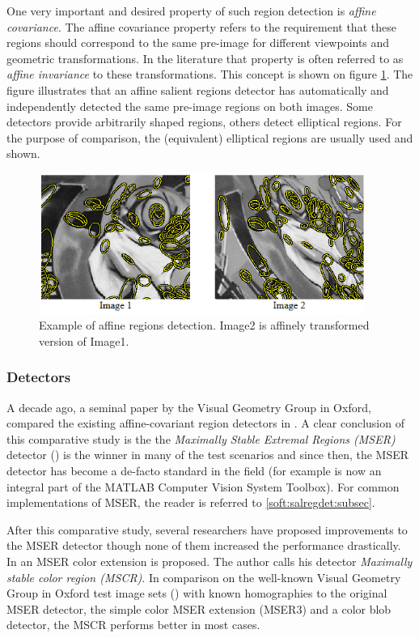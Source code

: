 One very important and desired property of such region detection is {\em affine covariance}.  The affine covariance property refers to the requirement that these regions should correspond to the same pre-image for different viewpoints and geometric transformations. In the literature that property is often referred to as {\em affine invariance} to these transformations. 
This concept is shown on figure \ref{fig:affreg}. The figure illustrates that an affine salient regions detector has automatically and independently detected the same pre-image regions on both images. Some detectors provide arbitrarily shaped regions, others detect elliptical regions. For the purpose of comparison, the (equivalent) elliptical regions are usually used and shown.
\begin{figure}[H]
\begin{center}
\includegraphics[width=0.95\textwidth]{fig/AffineRegions}
\end{center}
\caption{Example of affine regions detection. Image2 is affinely transformed version of Image1.}
\label{fig:affreg}
\end{figure}

\subsubsection{Detectors}
A decade ago, a seminal paper by the Visual Geometry Group in Oxford, compared the existing affine-covariant region detectors in \cite{Mikolajczyk:2005}. A clear conclusion of this comparative study is the the  {\em  Maximally Stable Extremal Regions (MSER)} detector (\cite{Matas2002BMVC}) is the winner in many of the test scenarios and since then, the MSER detector has become a de-facto standard in the field (for example is now an integral part of the MATLAB Computer Vision System Toolbox). For common implementations of MSER, the reader is referred to \ref{soft:salregdet:subsec}.

After this comparative study, several researchers have proposed improvements to the MSER detector though none of them increased the performance drastically. 
In \cite{Forssen07} an MSER color extension is proposed. The author calls his detector {\em Maximally stable color region (MSCR)}. In comparison on the well-known Visual Geometry Group in Oxford test image sets (\cite{vgg_soft_data}) with known homographies to the original MSER detector, the simple color MSER extension (MSER3) and a color blob detector, the MSCR performs better in most cases. 

